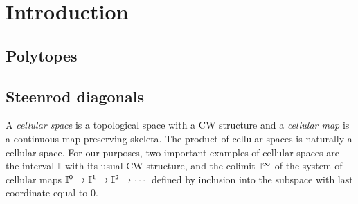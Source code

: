 
\section{Introduction} \label{s:introduction}

\subsection{Polytopes}

%
%

\subsection{Steenrod diagonals}

A \textit{cellular space} is a topological space with a CW structure and a \textit{cellular map} is a continuous map preserving skeleta.
The product of cellular spaces is naturally a cellular space.
For our purposes, two important examples of cellular spaces are the interval $\mathbb{I}$ with its usual CW structure, and the colimit $\mathbb{I}^\infty$ of the system of cellular maps $\mathbb{I}^0 \to \mathbb{I}^1 \to \mathbb{I}^2 \to \dotsb$ defined by inclusion into the subspace with last coordinate equal to $0$.

